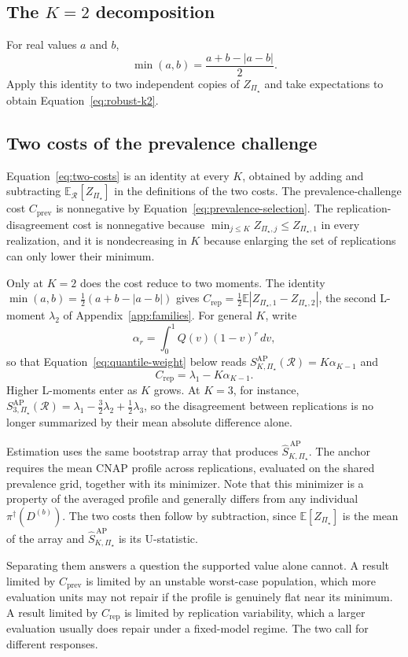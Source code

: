 \documentclass[11pt]{article}
\newcommand{\Regime}{\mathcal{R}}
\newcommand{\PSet}{\Pi_\star}
\newcommand{\E}{\mathbb{E}}
\newcommand{\SRob}{S_{K,\PSet}^{\mathrm{AP}}(\Regime)}
\newcommand{\SRobHat}{\widehat S_{K,\PSet}^{\,\mathrm{AP}}}
\theoremstyle{remark}
\begin{document}
\subsection{The $K=2$ decomposition}

For real values $a$ and $b$,
\[
\min(a,b)
=
\frac{a+b-|a-b|}{2}.
\]
Apply this identity to two independent copies of $Z_{\PSet}$ and take expectations to obtain Equation~\eqref{eq:robust-k2}.

\subsection{Two costs of the prevalence challenge}
\label{app:penalty}

Equation~\eqref{eq:two-costs} is an identity at every $K$, obtained by adding and subtracting $\E_{\Regime}[Z_{\PSet}]$ in the definitions of the two costs. The prevalence-challenge cost $C_{\mathrm{prev}}$ is nonnegative by Equation~\eqref{eq:prevalence-selection}. The replication-disagreement cost is nonnegative because $\min_{j\leq K}Z_{\PSet,j}\leq Z_{\PSet,1}$ in every realization, and it is nondecreasing in $K$ because enlarging the set of replications can only lower their minimum.

Only at $K=2$ does the cost reduce to two moments. The identity $\min(a,b)=\tfrac12(a+b-|a-b|)$ gives $C_{\mathrm{rep}}=\tfrac12\E|Z_{\PSet,1}-Z_{\PSet,2}|$, the second L-moment $\lambda_2$ of Appendix~\ref{app:families}. For general $K$, write
\[
\alpha_r=\int_0^1Q(v)(1-v)^r\,dv,
\]
so that Equation~\eqref{eq:quantile-weight} below reads $\SRob=K\alpha_{K-1}$ and
\[
C_{\mathrm{rep}}=\lambda_1-K\alpha_{K-1}.
\]
Higher L-moments enter as $K$ grows. At $K=3$, for instance, $S_{3,\PSet}^{\mathrm{AP}}(\Regime)=\lambda_1-\tfrac32\lambda_2+\tfrac12\lambda_3$, so the disagreement between replications is no longer summarized by their mean absolute difference alone.

Estimation uses the same bootstrap array that produces $\SRobHat$. The anchor requires the mean CNAP profile across replications, evaluated on the shared prevalence grid, together with its minimizer. Note that this minimizer is a property of the averaged profile and generally differs from any individual $\pi^\dagger(D^{(b)})$. The two costs then follow by subtraction, since $\E[Z_{\PSet}]$ is the mean of the array and $\SRobHat$ is its U-statistic.

Separating them answers a question the supported value alone cannot. A result limited by $C_{\mathrm{prev}}$ is limited by an unstable worst-case population, which more evaluation units may not repair if the profile is genuinely flat near its minimum. A result limited by $C_{\mathrm{rep}}$ is limited by replication variability, which a larger evaluation usually does repair under a fixed-model regime. The two call for different responses.
\end{document}
